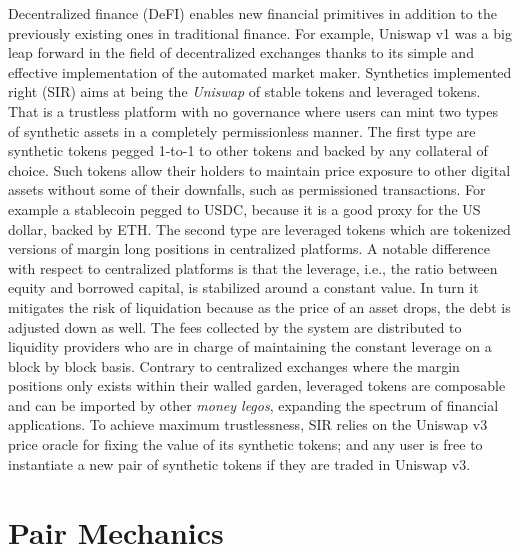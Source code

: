 \documentclass[journal,letterpaper,oneside,onecolumn,12pt]{IEEEtran}
\begin{document}
	Decentralized finance (DeFI) enables new financial primitives in addition to the previously existing ones in traditional finance. For example, Uniswap v1 was a big leap forward in the field of decentralized exchanges thanks to its simple and effective implementation of the automated market maker.
	Synthetics implemented right (SIR) aims at being the \textit{Uniswap} of stable tokens and leveraged tokens. That is a trustless platform with no governance where users can mint two types of synthetic assets in a completely permissionless manner. The first type are synthetic tokens pegged 1-to-1 to other tokens and backed by any collateral of choice. Such tokens allow their holders to maintain price exposure to other digital assets without some of their downfalls, such as permissioned transactions. For example a stablecoin  pegged to USDC, because it is a good proxy for the US dollar, backed by ETH. The second type are leveraged tokens which are tokenized versions of margin long positions in centralized platforms. 
	A notable difference with respect to centralized platforms is that the leverage, i.e., the ratio between equity and borrowed capital, is stabilized around a constant value. In turn it mitigates the risk of liquidation because as the price of an asset drops, the debt is adjusted down as well. 
	The fees collected by the system are distributed to liquidity providers who are in charge of maintaining the constant leverage on a block by block basis.	
	Contrary to centralized exchanges where the margin positions only exists within their walled garden, leveraged tokens are composable and can be imported by other \textit{money legos}, expanding the spectrum of financial applications.
	To achieve maximum trustlessness, SIR relies on the Uniswap v3 price oracle for fixing the value of its synthetic tokens; and any user is free to instantiate a new pair of synthetic tokens if they are traded in Uniswap v3.
	
	


	

	\section{Pair Mechanics}
	
\end{document}

